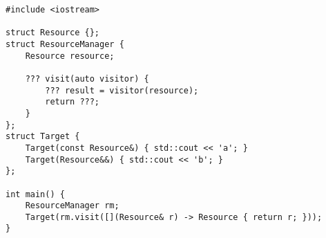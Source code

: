 \begin{lstlisting}[title=\href{https://godbolt.org/z/d1WeqT}{\texttt{godbolt.org/z/d1WeqT}}]
#include <iostream>

struct Resource {};
struct ResourceManager {
    Resource resource;

    ??? visit(auto visitor) {
        ??? result = visitor(resource);
        return ???;
    }
};
struct Target {
    Target(const Resource&) { std::cout << 'a'; }
    Target(Resource&&) { std::cout << 'b'; }
};

int main() {
    ResourceManager rm;
    Target(rm.visit([](Resource& r) -> Resource { return r; }));
}
\end{lstlisting}
